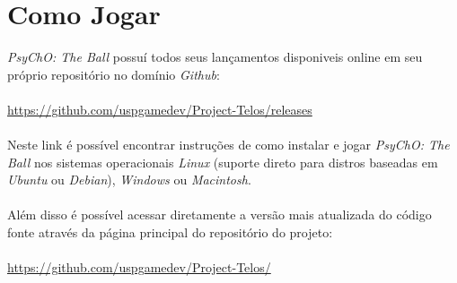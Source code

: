 \section{Como Jogar}
\label{sec:how_to_play}


\textit{PsyChO: The Ball} possuí todos seus lançamentos disponiveis online em seu próprio repositório no domínio \textit{Github}:
\\~\\
\url{https://github.com/uspgamedev/Project-Telos/releases}
\\~\\
Neste link é possível encontrar instruções de como instalar e jogar \textit{PsyChO: The Ball} nos sistemas operacionais \textit{Linux} (suporte direto para distros baseadas em \textit{Ubuntu} ou \textit{Debian}), \textit{Windows} ou \textit{Macintosh}.
\\~\\
Além disso é possível acessar diretamente a versão mais atualizada do código fonte através da página principal do repositório do projeto:
\\~\\
\url{https://github.com/uspgamedev/Project-Telos/}

